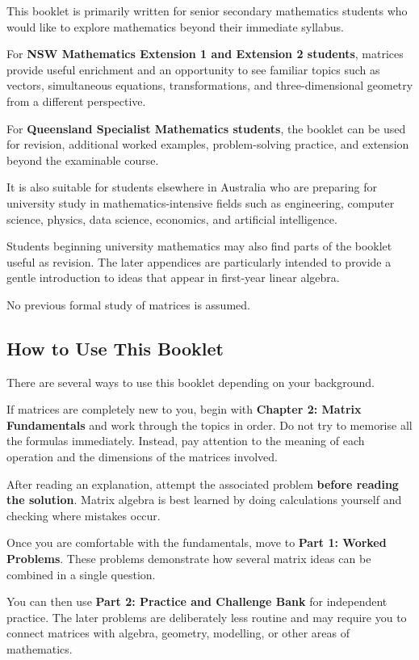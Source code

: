 \documentclass[12pt]{article}
\begin{document}
This booklet is primarily written for senior secondary mathematics students who would like to explore mathematics beyond their immediate syllabus.

For \textbf{NSW Mathematics Extension 1 and Extension 2 students}, matrices provide useful enrichment and an opportunity to see familiar topics such as vectors, simultaneous equations, transformations, and three-dimensional geometry from a different perspective.

For \textbf{Queensland Specialist Mathematics students}, the booklet can be used for revision, additional worked examples, problem-solving practice, and extension beyond the examinable course.

It is also suitable for students elsewhere in Australia who are preparing for university study in mathematics-intensive fields such as engineering, computer science, physics, data science, economics, and artificial intelligence.

Students beginning university mathematics may also find parts of the booklet useful as revision. The later appendices are particularly intended to provide a gentle introduction to ideas that appear in first-year linear algebra.

No previous formal study of matrices is assumed.

\subsection{How to Use This Booklet}

There are several ways to use this booklet depending on your background.

If matrices are completely new to you, begin with \textbf{Chapter 2: Matrix Fundamentals} and work through the topics in order. Do not try to memorise all the formulas immediately. Instead, pay attention to the meaning of each operation and the dimensions of the matrices involved.

After reading an explanation, attempt the associated problem \textbf{before reading the solution}. Matrix algebra is best learned by doing calculations yourself and checking where mistakes occur.

Once you are comfortable with the fundamentals, move to \textbf{Part 1: Worked Problems}. These problems demonstrate how several matrix ideas can be combined in a single question.

You can then use \textbf{Part 2: Practice and Challenge Bank} for independent practice. The later problems are deliberately less routine and may require you to connect matrices with algebra, geometry, modelling, or other areas of mathematics.
\end{document}
